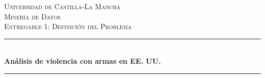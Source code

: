\documentclass[11pt,a4paper]{article}
\begin{document}


\begin{titlepage} %
	\newcommand{\HRule}{\rule{\linewidth}{0.5mm}} %
	
	\center %
	
	
	\textsc{\LARGE Universidad de Castilla-La Mancha}\\[1.5cm] %
	
	\textsc{\Large Minería de Datos}\\[0.5cm] %
	
	\textsc{\large Entregable 1: Definición del Problema}\\[0.5cm] %
	
	
	\HRule\\[0.4cm]
	
	{\huge\bfseries Análisis de violencia con armas en EE. UU.}\\[0.4cm] %
	
	\HRule\\[1.5cm]
	
	

\end{titlepage}
\end{document}
